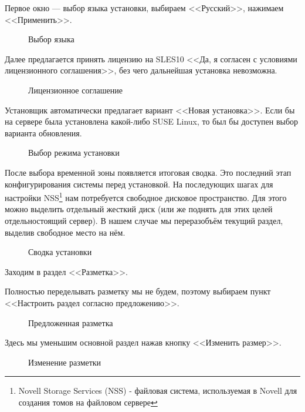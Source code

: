 Первое окно — выбор языка установки, выбираем <<Русский>>, нажимаем <<Применить>>.
\begin{figure}[H]
\caption{Выбор языка}
\label{fig2}
\end{figure}
\clearpage

Далее предлагается принять лицензию на SLES10 <<Да, я согласен с условиями лицензионного соглашения>>, без чего дальнейшая установка невозможна.
\begin{figure}[H]
\caption{Лицензионное соглашение}
\label{fig3}
\end{figure}
\clearpage

Установщик автоматически предлагает вариант <<Новая установка>>. Если бы на сервере была установлена какой-либо SUSE Linux, то был бы доступен выбор варианта обновления.
\begin{figure}[H]
\caption{Выбор режима установки}
\label{fig4}
\end{figure}
\clearpage

После выбора временной зоны появляется итоговая сводка. Это последний этап конфигурирования системы перед установкой. На последующих шагах для настройки NSS\footnote{Novell Storage Services (NSS) - файловая система, используемая в Novell для создания томов на файловом сервере} нам потребуется свободное дисковое пространство. Для этого можно выделить отдельный жесткий диск (или же поднять для этих целей отдельностоящий сервер). В нашем случае мы переразобъём текущий раздел, выделив свободное место на нём.
\begin{figure}[H]
\caption{Сводка установки}
\label{p1}
\end{figure}
Заходим в раздел <<Разметка>>.
\clearpage

Полностью переделывать разметку мы не будем, поэтому выбираем пункт <<Настроить раздел согласно предложению>>.
\begin{figure}[H]
\caption{Предложенная разметка}
\label{p2}
\end{figure}
\clearpage

Здесь мы уменьшим основной раздел нажав кнопку <<Изменить размер>>.
\begin{figure}[H]
\caption{Изменение разметки}
\label{p3}
\end{figure}
\clearpage

